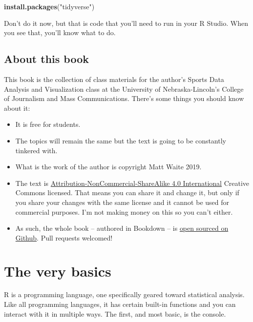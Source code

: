 \documentclass[
]{book}
\newenvironment{Shaded}{\begin{snugshade}}{\end{snugshade}}
\newcommand{\KeywordTok}[1]{\textcolor[rgb]{0.13,0.29,0.53}{\textbf{#1}}}
\newcommand{\NormalTok}[1]{#1}
\newcommand{\StringTok}[1]{\textcolor[rgb]{0.31,0.60,0.02}{#1}}
\providecommand{\tightlist}{%
  \setlength{\itemsep}{0pt}\setlength{\parskip}{0pt}}
\begin{document}
\begin{Shaded}
\begin{Highlighting}[]
\KeywordTok{install.packages}\NormalTok{(}\StringTok{"tidyverse"}\NormalTok{)}
\end{Highlighting}
\end{Shaded}

Don't do it now, but that is code that you'll need to run in your R Studio. When you see that, you'll know what to do.

\hypertarget{about-this-book}{%
\section{About this book}\label{about-this-book}}

This book is the collection of class materials for the author's Sports Data Analysis and Visualization class at the University of Nebraska-Lincoln's College of Journalism and Mass Communications. There's some things you should know about it:

\begin{itemize}
\tightlist
\item
  It is free for students.
\item
  The topics will remain the same but the text is going to be constantly tinkered with.
\item
  What is the work of the author is copyright Matt Waite 2019.
\item
  The text is \href{https://creativecommons.org/licenses/by-nc-sa/4.0/}{Attribution-NonCommercial-ShareAlike 4.0 International} Creative Commons licensed. That means you can share it and change it, but only if you share your changes with the same license and it cannot be used for commercial purposes. I'm not making money on this so you can't either.\\
\item
  As such, the whole book -- authored in Bookdown -- is \href{https://github.com/mattwaite/sportsdatabook}{open sourced on Github}. Pull requests welcomed!
\end{itemize}

\hypertarget{the-very-basics}{%
\chapter{The very basics}\label{the-very-basics}}

R is a programming language, one specifically geared toward statistical analysis. Like all programming languages, it has certain built-in functions and you can interact with it in multiple ways. The first, and most basic, is the console.
\end{document}

